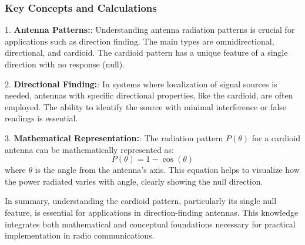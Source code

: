 \subsubsection{Key Concepts and Calculations}

1. \textbf{Antenna Patterns:}: Understanding antenna radiation patterns is crucial for applications such as direction finding. The main types are omnidirectional, directional, and cardioid. The cardioid pattern has a unique feature of a single direction with no response (null).

2. \textbf{Directional Finding:}: In systems where localization of signal sources is needed, antennas with specific directional properties, like the cardioid, are often employed. The ability to identify the source with minimal interference or false readings is essential.

3. \textbf{Mathematical Representation:}: The radiation pattern \( P(\theta) \) for a cardioid antenna can be mathematically represented as: 
   \[
   P(\theta) = 1 - \cos(\theta)
   \]
   where \( \theta \) is the angle from the antenna's axis. This equation helps to visualize how the power radiated varies with angle, clearly showing the null direction.

In summary, understanding the cardioid pattern, particularly its single null feature, is essential for applications in direction-finding antennas. This knowledge integrates both mathematical and conceptual foundations necessary for practical implementation in radio communications. 

